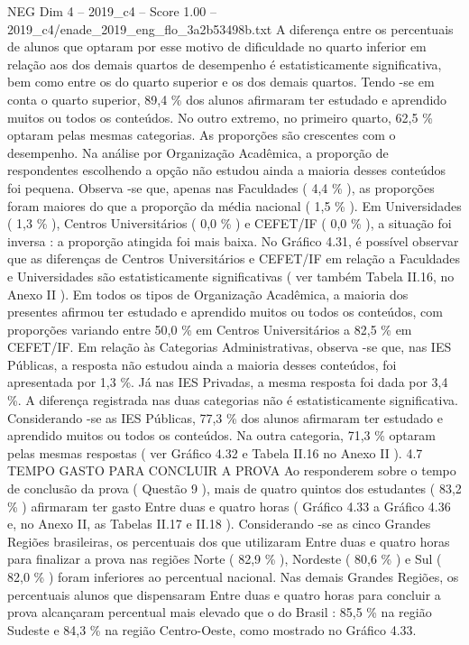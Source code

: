 \begin{textsample}{NEG Dim 4 – 2019\_c4 – Score 1.00 – 2019\_c4/enade\_2019\_eng\_flo\_3a2b53498b.txt}
A diferença entre os percentuais de alunos que optaram por esse motivo de dificuldade no quarto inferior em relação aos dos demais quartos de desempenho é estatisticamente significativa, bem como entre os do quarto superior e os dos demais quartos.
Tendo -se em conta o quarto superior, 89,4 \% dos alunos afirmaram ter estudado e aprendido muitos ou todos os conteúdos.
No outro extremo, no primeiro quarto, 62,5 \% optaram pelas mesmas categorias.
As proporções são crescentes com o desempenho.
Na análise por Organização Acadêmica, a proporção de respondentes escolhendo a opção não estudou ainda a maioria desses conteúdos foi pequena.
Observa -se que, apenas nas Faculdades ( 4,4 \% ), as proporções foram maiores do que a proporção da média nacional ( 1,5 \% ).
Em Universidades ( 1,3 \% ), Centros Universitários ( 0,0 \% ) e CEFET/IF ( 0,0 \% ), a situação foi inversa : a proporção atingida foi mais baixa.
No Gráfico 4.31, é possível observar que as diferenças de Centros Universitários e CEFET/IF em relação a Faculdades e Universidades são estatisticamente significativas ( ver também Tabela II.16, no Anexo II ).
Em todos os tipos de Organização Acadêmica, a maioria dos presentes afirmou ter estudado e aprendido muitos ou todos os conteúdos, com proporções variando entre 50,0 \% em Centros Universitários a 82,5 \% em CEFET/IF.
Em relação às Categorias Administrativas, observa -se que, nas IES Públicas, a resposta não estudou ainda a maioria desses conteúdos, foi apresentada por 1,3 \%.
Já nas IES Privadas, a mesma resposta foi dada por 3,4 \%.
A diferença registrada nas duas categorias não é estatisticamente significativa.
Considerando -se as IES Públicas, 77,3 \% dos alunos afirmaram ter estudado e aprendido muitos ou todos os conteúdos.
Na outra categoria, 71,3 \% optaram pelas mesmas respostas ( ver Gráfico 4.32 e Tabela II.16 no Anexo II ). 4.7 TEMPO GASTO PARA CONCLUIR A PROVA Ao responderem sobre o tempo de conclusão da prova ( Questão 9 ), mais de quatro quintos dos estudantes ( 83,2 \% ) afirmaram ter gasto Entre duas e quatro horas ( Gráfico 4.33 a Gráfico 4.36 e, no Anexo II, as Tabelas II.17 e II.18 ).
Considerando -se as cinco Grandes Regiões brasileiras, os percentuais dos que utilizaram Entre duas e quatro horas para finalizar a prova nas regiões Norte ( 82,9 \% ), Nordeste ( 80,6 \% ) e Sul ( 82,0 \% ) foram inferiores ao percentual nacional.
Nas demais Grandes Regiões, os percentuais alunos que dispensaram Entre duas e quatro horas para concluir a prova alcançaram percentual mais elevado que o do Brasil : 85,5 \% na região Sudeste e 84,3 \% na região Centro-Oeste, como mostrado no Gráfico 4.33.

\end{textsample}
